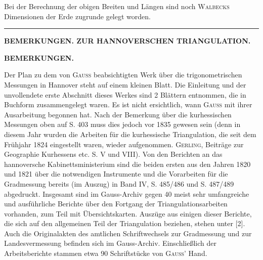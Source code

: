 \par\noindent\hspace*{\parindent}Bei der Berechnung der obigen Breiten und Längen sind noch \textsc{Walbecks} Dimensionen der Erde zugrunde gelegt worden.
\begin{center}\rule{2.6cm}{0.4pt}\end{center}

\par\clearpage
\noindent\null\hfill{\small\textbf{BEMERKUNGEN. ZUR HANNOVERSCHEN TRIANGULATION.}}\hfill{}\par\medskip
\begin{center}\textbf{BEMERKUNGEN.}\end{center}
\begingroup\small
\par\noindent\hspace*{\parindent}Der Plan zu dem von \textsc{Gauss} beabsichtigten Werk über die trigonometrischen Messungen in Hannover steht auf einem kleinen Blatt. Die Einleitung und der unvollendete erste Abschnitt dieses Werkes sind 2 Blättern entnommen, die in Buchform zusammengelegt waren. Es ist nicht ersichtlich, wann \textsc{Gauss} mit ihrer Ausarbeitung begonnen hat. Nach der Bemerkung über die kurhessischen Messungen oben auf S. 403 muss dies jedoch vor 1835 gewesen sein (denn in diesem Jahr wurden die Arbeiten für die kurhessische Triangulation, die seit dem Frühjahr 1824 eingestellt waren, wieder aufgenommen. \textsc{Gerling}, Beiträge zur Geographie Kurhessens etc. S. V und VIII). Von den Berichten an das hannoversche Kabinettsministerium sind die beiden ersten aus den Jahren 1820 und 1821 über die notwendigen Instrumente und die Vorarbeiten für die Gradmessung bereits (im Auszug) in Band IV, S. 485/486 und S. 487/489 abgedruckt. Insgesamt sind im Gauss-Archiv gegen 40 meist sehr umfangreiche und ausführliche Berichte über den Fortgang der Triangulationsarbeiten vorhanden, zum Teil mit Übersichtskarten. Auszüge aus einigen dieser Berichte, die sich auf den allgemeinen Teil der Triangulation beziehen, stehen unter [2]. Auch die Originalakten des amtlichen Schriftwechsels zur Gradmessung und zur Landesvermessung befinden sich im Gauss-Archiv. Einschließlich der Arbeitsberichte stammen etwa 90 Schriftstücke von \textsc{Gauss}' Hand.

